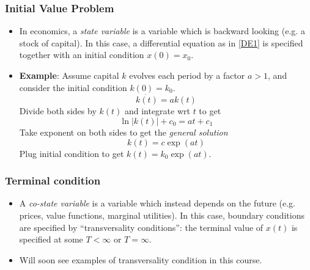 \documentclass[11pt]{beamer}
\begin{document}
\begin{frame}
\frametitle{Initial Value Problem}
\begin{itemize}\itemsep2ex
	\item In economics, a \textit{state variable} is a variable which is backward looking (e.g. a stock of capital). In this case, a differential equation as in \eqref{DE1} is specified together with an initial condition $x(0)=x_0$.
	\item \textbf{Example}: Assume capital $k$ evolves each period by a factor $a>1$, and consider the initial condition $k(0)=k_0$.
	\begin{equation*}
	\dot{k(t)} = a k(t)
	\end{equation*}
	Divide both sides by $k(t)$ and integrate wrt $t$ to get
	\begin{equation*}
	\ln |k(t)| + c_0 = a t + c_1
	\end{equation*}
	Take exponent on both sides to get the \textit{general solution}
	\begin{equation*}
	k(t) = c \exp(a t)
	\end{equation*}
	Plug initial condition to get $k(t) = k_0 \exp(a t)$.
\end{itemize}
\end{frame}


\begin{frame}
\frametitle{Terminal condition}
\begin{itemize}\itemsep2ex
	\item A \textit{co-state variable} is a variable which instead depends on the future (e.g. prices, value functions, marginal utilities). In this case, boundary conditions are specified by ``transversality conditions'': the terminal value of $x(t)$ is specified at some $T<\infty$ or $T=\infty$.
	\item Will soon see examples of transversality condition in this course.
\end{itemize}
\end{frame}
\end{document}
